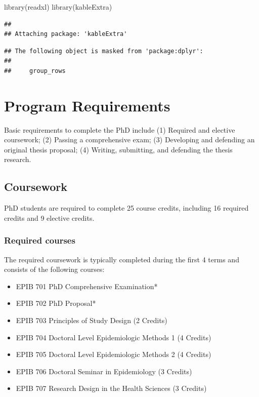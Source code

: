 \documentclass[
]{book}
\newenvironment{Shaded}{\begin{snugshade}}{\end{snugshade}}
\newcommand{\FunctionTok}[1]{\textcolor[rgb]{0.00,0.00,0.00}{#1}}
\newcommand{\NormalTok}[1]{#1}
\providecommand{\tightlist}{%
  \setlength{\itemsep}{0pt}\setlength{\parskip}{0pt}}
\begin{document}
\begin{Shaded}
\begin{Highlighting}[]
\FunctionTok{library}\NormalTok{(readxl)}
\FunctionTok{library}\NormalTok{(kableExtra)}
\end{Highlighting}
\end{Shaded}

\begin{verbatim}
## 
## Attaching package: 'kableExtra'
\end{verbatim}

\begin{verbatim}
## The following object is masked from 'package:dplyr':
## 
##     group_rows
\end{verbatim}

\hypertarget{program-requirements}{%
\chapter{Program Requirements}\label{program-requirements}}

Basic requirements to complete the PhD include (1) Required and elective coursework; (2) Passing a comprehensive exam; (3) Developing and defending an original thesis proposal; (4) Writing, submitting, and defending the thesis research.

\hypertarget{coursework-1}{%
\section{Coursework}\label{coursework-1}}

PhD students are required to complete 25 course credits, including 16 required credits and 9 elective credits.

\hypertarget{required-courses-1}{%
\subsection{Required courses}\label{required-courses-1}}

The required coursework is typically completed during the first 4 terms and consists of the following courses:

\begin{itemize}
\tightlist
\item
  EPIB 701 PhD Comprehensive Examination*
\item
  EPIB 702 PhD Proposal*
\item
  EPIB 703 Principles of Study Design (2 Credits)
\item
  EPIB 704 Doctoral Level Epidemiologic Methods 1 (4 Credits)
\item
  EPIB 705 Doctoral Level Epidemiologic Methods 2 (4 Credits)
\item
  EPIB 706 Doctoral Seminar in Epidemiology (3 Credits)
\item
  EPIB 707 Research Design in the Health Sciences (3 Credits)
\end{itemize}
\end{document}
